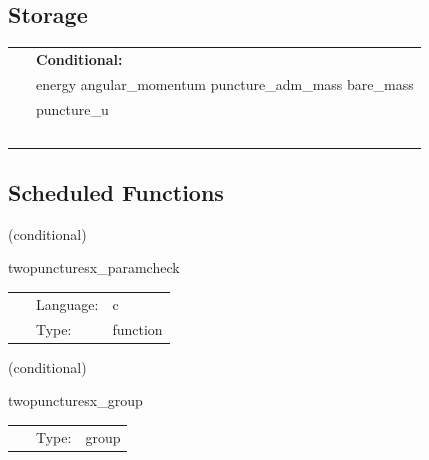 \subsection*{Storage}

\hspace{5mm}

 \begin{tabular*}{160mm}{ll} 
~& {\bf Conditional:} \\ 
~ &  energy angular\_momentum puncture\_adm\_mass bare\_mass\\ 
~ &  puncture\_u\\ 
~ & ~\\ 
\end{tabular*} 


\subsection*{Scheduled Functions}
\vspace{5mm}

   (conditional) 

\hspace{5mm} twopuncturesx\_paramcheck 

\hspace{5mm}{\it check parameters and thorn needs } 


\hspace{5mm}

 \begin{tabular*}{160mm}{cll} 
~ & Language:  & c \\ 
~ & Type:  & function \\ 
\end{tabular*} 


\vspace{5mm}

   (conditional) 

\hspace{5mm} twopuncturesx\_group 

\hspace{5mm}{\it twopuncturesx initial data group } 


\hspace{5mm}

 \begin{tabular*}{160mm}{cll} 
~ & Type:  & group \\ 
\end{tabular*} 


\vspace{5mm}


